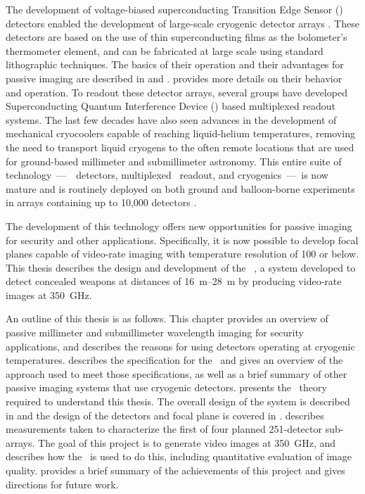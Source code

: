 The development of voltage-biased superconducting Transition Edge Sensor (\TES) detectors enabled the development of large-scale cryogenic detector arrays \cite{irwin_application_1995}.
These detectors are based on the use of thin superconducting films as the bolometer's thermometer element, and can be fabricated at large scale using standard lithographic techniques.
The basics of their operation and their advantages for passive imaging are described in  and .
 provides more details on their behavior and operation.
To readout these detector arrays, several groups have developed Superconducting Quantum Interference Device (\SQUID) based multiplexed readout systems.
The last few decades have also seen advances in the development of mechanical cryocoolers capable of reaching liquid-helium temperatures, removing the need to transport liquid cryogens to the often remote locations that are used for ground-based millimeter and submillimeter astronomy.
This entire suite of technology~---~\TES\ detectors, multiplexed \SQUID\ readout, and cryogenics~---~is now mature and is routinely deployed on both ground and balloon-borne experiments in arrays containing up to 10,000 detectors \cite{holland_scuba-2:_2013}.

The development of this technology offers new opportunities for passive imaging for security and other applications.
Specifically, it is now possible to develop focal planes capable of video-rate imaging with temperature resolution of \SI{100}{\mK} or below.
This thesis describes the design and development of the \NIST\ \Imager, a system developed to detect concealed weapons at distances of \SIrange{16}{28}{\m} by producing video-rate images at \SI{350}{\GHz}.

An outline of this thesis is as follows.
This chapter provides an overview of passive millimeter and submillimeter wavelength imaging for security applications, and describes the reasons for using detectors operating at cryogenic temperatures.
 describes the specification for the \Imager\ and gives an overview of the approach used to meet those specifications, as well as a brief summary of other passive imaging systems that use cryogenic detectors.
 presents the \TES\ theory required to understand this thesis.
The overall design of the system is described in  and the design of the detectors and focal plane is covered in .
 describes measurements taken to characterize the first of four planned 251-detector sub-arrays.
The goal of this project is to generate video images at \SI{350}{\GHz}, and  describes how the \Imager\ is used to do this, including quantitative evaluation of image quality.
 provides a brief summary of the achievements of this project and gives directions for future work.

